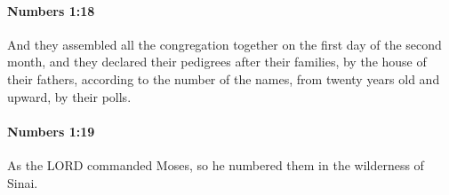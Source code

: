 		\paragraph{Numbers 1:18} %
			\label{NUMBERS-1-18}

			And they assembled all the congregation together on the first day of the second month, and they declared their pedigrees after their families, by the house of their fathers, according to the number of the names, from twenty years old and upward, by their polls.


		\paragraph{Numbers 1:19} %
			\label{NUMBERS-1-19}

			As the LORD commanded Moses, so he numbered them in the wilderness of Sinai.


